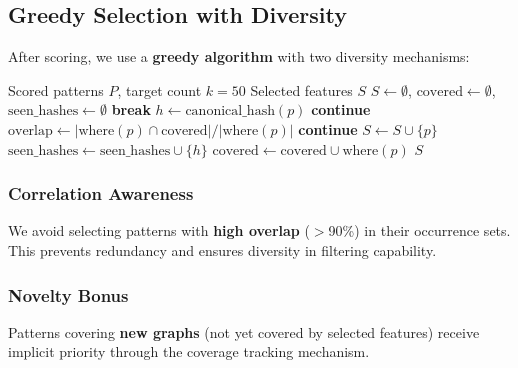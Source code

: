 \documentclass[12pt,a4paper]{article}
\begin{document}
\subsection{Greedy Selection with Diversity}

After scoring, we use a \textbf{greedy algorithm} with two diversity mechanisms:

\begin{algorithm}[H]
\caption{Greedy Feature Selection with Diversity}
\begin{algorithmic}[1]
\Require Scored patterns $P$, target count $k=50$
\Ensure Selected features $S$
\State $S \gets \emptyset$, $\text{covered} \gets \emptyset$, $\text{seen\_hashes} \gets \emptyset$
        \State \textbf{break}
    \EndIf
    \State $h \gets \text{canonical\_hash}(p)$
        \State \textbf{continue} 
    \EndIf
    \State $\text{overlap} \gets |\text{where}(p) \cap \text{covered}| / |\text{where}(p)|$
        \State \textbf{continue} 
    \EndIf
    \State $S \gets S \cup \{p\}$
    \State $\text{seen\_hashes} \gets \text{seen\_hashes} \cup \{h\}$
    \State $\text{covered} \gets \text{covered} \cup \text{where}(p)$
\EndFor
\State \Return $S$
\end{algorithmic}
\end{algorithm}

\subsubsection{Correlation Awareness}

We avoid selecting patterns with \textbf{high overlap} ($>$90\%) in their occurrence sets. This prevents redundancy and ensures diversity in filtering capability.

\subsubsection{Novelty Bonus}

Patterns covering \textbf{new graphs} (not yet covered by selected features) receive implicit priority through the coverage tracking mechanism.

\end{document}
